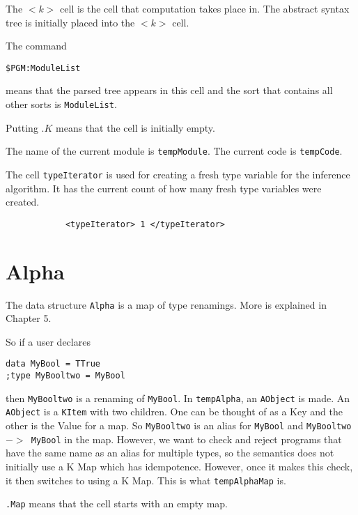\noindent
The \texttt{$<k>$} cell is the cell that computation takes place in.
The abstract syntax tree is initially placed into the \texttt{$<k>$} cell.

\noindent
The command

\begin{lstlisting}
$PGM:ModuleList
\end{lstlisting}

\noindent
means that the parsed tree appears in this cell and the sort that contains all other sorts is \texttt{ModuleList}.

\noindent
Putting \texttt{$.K$} means that the cell is initially empty.

\noindent
The name of the current module is \texttt{tempModule}. The current code is \texttt{tempCode}.

\noindent
The cell \texttt{typeIterator} is used for creating a fresh type variable for the inference algorithm. It has the current count of how many fresh type variables were created.

\begin{lstlisting}
            <typeIterator> 1 </typeIterator>
\end{lstlisting}

\section{Alpha}
The data structure \texttt{Alpha} is a map of type renamings. More is explained in Chapter 5.

So if a user declares

\begin{lstlisting}
data MyBool = TTrue
;type MyBooltwo = MyBool
\end{lstlisting}

\noindent
then \texttt{MyBooltwo} is a renaming of \texttt{MyBool}. In \texttt{tempAlpha}, an \texttt{AObject} is made. An \texttt{AObject} is a \texttt{KItem} with two children. One can be thought of as a Key and the other is the Value for a map. So \texttt{MyBooltwo} is an alias for \texttt{MyBool} and \texttt{MyBooltwo $->$ MyBool} in the map. However, we want to check and reject programs that have the same name as an alias for multiple types, so the semantics does not initially use a K Map which has idempotence. However, once it makes this check, it then switches to using a K Map. This is what \texttt{tempAlphaMap} is.

\texttt{.Map} means that the cell starts with an empty map.

